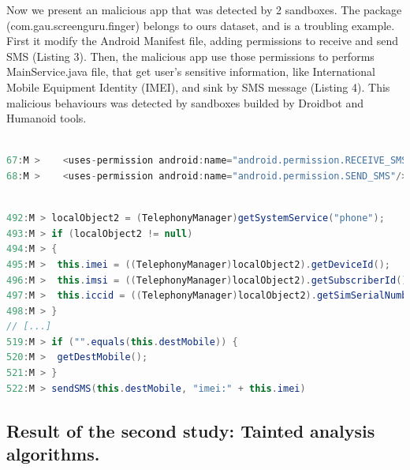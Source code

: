Now we present an malicious app that was detected by 2 sandboxes. The package (com.gau.screenguru.finger) belongs to ours dataset, and is a troubling example. First it modify the Android Manifest file, adding permissions to receive and send SMS (Listing 3). Then, the malicious app use those permissions to performs MainService.java file, that get user's sensitive information, like International Mobile Equipment Identity (IMEI), and sink by SMS message (Listing 4). This malicious behaviours was detected by sandboxes builded by Droidbot and Humanoid tools.

\begin{lstlisting}[caption= AndroidManifest.xml - (com.gau.screenguru.finger), language=Java, basicstyle=\fontsize{8}{6}\selectfont\ttfamily,label={lst:com.gau.screenguru.finger:androidmanifest}]

67:M >    <uses-permission android:name="android.permission.RECEIVE_SMS"/>
68:M >    <uses-permission android:name="android.permission.SEND_SMS"/>
\end{lstlisting}

\begin{lstlisting}[caption= com/android/main/MainService.java - (com.gau.screenguru.finger), language=Java, basicstyle=\fontsize{8}{6}\selectfont\ttfamily,label={lst:(com.gau.screenguru.finger):mainservice}]

492:M > localObject2 = (TelephonyManager)getSystemService("phone");
493:M > if (localObject2 != null)
494:M > {
495:M >  this.imei = ((TelephonyManager)localObject2).getDeviceId();
496:M >  this.imsi = ((TelephonyManager)localObject2).getSubscriberId();
497:M >  this.iccid = ((TelephonyManager)localObject2).getSimSerialNumber();
498:M > }
// [...]
519:M > if ("".equals(this.destMobile)) {
520:M >  getDestMobile();
521:M > }
522:M > sendSMS(this.destMobile, "imei:" + this.imei)
\end{lstlisting}




\subsection{Result of the second study: Tainted analysis algorithms.}\label{sec:res-ss}

